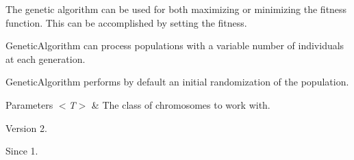 The genetic algorithm can be used for both maximizing or minimizing the fitness function. This can be accomplished by setting the fitness. 

{\ttfamily Genetic\-Algorithm} can process populations with a variable number of individuals at each generation. 

{\ttfamily Genetic\-Algorithm} performs by default an initial randomization of the population. 


\begin{DoxyParams}{Parameters}
{\em $<$\-T$>$} & The class of chromosomes to work with.\\
\hline
\end{DoxyParams}
\begin{DoxyVersion}{Version}
2. 
\end{DoxyVersion}
\begin{DoxySince}{Since}
1. 
\end{DoxySince}


